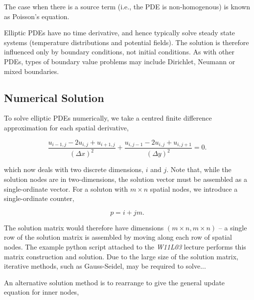 \documentclass[12pt]{article}
\begin{document}
\vspace{4mm}

The case when there is a source term (i.e., the PDE is non-homogenous) is known as Poisson's equation.

\vspace{4mm}

Elliptic PDEs have no time derivative, and hence typically solve steady state systems (temperature distributions and potential fields). The solution is therefore influenced only by boundary conditions, not initial conditions. As with other PDEs, types of boundary value problems may include Dirichlet, Neumann or mixed boundaries.

\subsection{Numerical Solution}

To solve elliptic PDEs numerically, we take a centred finite difference approximation for each spatial derivative,

\vspace{2mm}

$$ \frac{u_{i-1,j} - 2u_{i,j} + u_{i+1,j}}{(\Delta x)^2} + \frac{u_{i,j-1} - 2u_{i,j} + u_{i,j+1}}{(\Delta y)^2} = 0.$$

\vspace{4mm}

which now deals with two discrete dimensions, $i$ and $j$. Note that, while the solution nodes are in two-dimensions, the solution vector must be assembled as a single-ordinate vector. For a soluton with $m\times n$ spatial nodes, we introduce a single-ordinate counter,

\vspace{2mm}

$$ p=i+jm.$$

\vspace{4mm}

The solution matrix would therefore have dimensions $(m\times n,m\times n)$ -- a single row of the solution matrix is assembled by moving along each row of spatial nodes. The example python script attached to the {\it W11L03} lecture performs this matrix construction and solution. Due to the large size of the solution matrix, iterative methods, such as Gauss-Seidel, may be required to solve...

\vspace{4mm}

An alternative solution method is to rearrange to give the general update equation for inner nodes,
\end{document}
